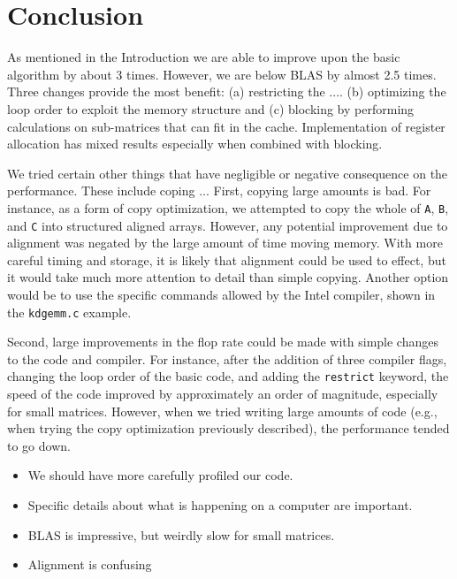 \documentclass{article}
\begin{document}
\section{Conclusion}

As mentioned in the Introduction we are able to improve upon the basic algorithm by about 3 times. However, we are below BLAS by almost 2.5 times. Three changes provide the most benefit: (a) restricting the .... (b) optimizing the loop order to exploit the memory structure and (c) blocking by performing calculations on sub-matrices that can fit in the cache. Implementation of register allocation has mixed results especially when combined with blocking.

We tried certain other things that have negligible or negative consequence on the performance. These include coping ... First, copying large amounts is bad. For instance, as a form of copy optimization, we attempted to copy the whole of \texttt{A}, \texttt{B}, and \texttt{C} into structured aligned arrays. However, any potential improvement due to alignment was negated by the large amount of time moving memory. With more careful timing and storage, it is likely that alignment could be used to effect, but it would take much more attention to detail than simple copying. Another option would be to use the specific commands allowed by the Intel compiler, shown in the \texttt{kdgemm.c} example.

Second, large improvements in the flop rate could be made with simple changes to the code and compiler. For instance, after the addition of three compiler flags, changing the loop order of the basic code, and adding the \texttt{restrict} keyword, the speed of the code improved by approximately an order of magnitude, especially for small matrices. However, when we tried writing large amounts of code (e.g., when trying the copy optimization previously described), the performance tended to go down. 
\begin{itemize}
	\item We should have more carefully profiled our code. 
	\item Specific details about what is happening on a computer are important.
	\item BLAS is impressive, but weirdly slow for small matrices.
	\item Alignment is confusing
\end{itemize}
\end{document}
